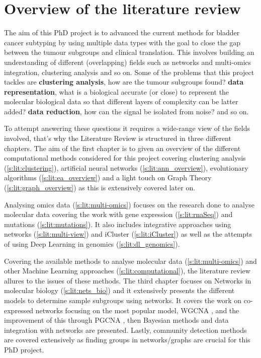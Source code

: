 

\section{Overview of the literature review}


The aim of this PhD project is to advanced the current methods for bladder cancer subtyping by using multiple data types with the goal to close the gap between the tumour subgroups and clinical translation. This involves building an understanding of different (overlapping) fields such as networks and multi-omics integration, clustering analysis and so on. Some of the problems that this project tackles are \textbf{clustering analysis}, how are the tumour subgroups found? \textbf{data representation}, what is a biological accurate (or close) to represent the molecular biological data so that different layers of complexity can be latter added? \textbf{data reduction}, how can the signal be isolated from noise? and so on.

To attempt answering these questions it requires a wide-range view of the fields involved, that's why the Literature Review is structured in three different chapters. The aim of the first chapter is to given an overview of the different computational methods considered for this project covering clustering analysis (\ref{s:lit:clustering}), artificial neural networks (\ref{s:lit:ann_overview}), evolutionary algorithms (\ref{s:lit:ea_overview}) and a light touch on Graph Theory (\ref{s:lit:graph_overview}) as this is extensively covered later on.

Analysing omics data (\ref{s:lit:multi-omics}) focuses on the research done to analyse molecular data covering the work with gene expression (\ref{s:lit:rnaSeq}) and mutations (\ref{s:lit:mutations}). It also includes integrative approaches using networks (\ref{s:lit:multi-view}) and iCluster (\ref{s:lit:iCluster}) as well as the attempts of using Deep Learning in genomics (\ref{s:lit:dl_genomics}). 

Covering the available methods to analyse molecular data (\ref{s:lit:multi-omics}) and other Machine Learning approaches (\ref{s:lit:computational}), the literature review allures to the issues of these methods. The third chapter focuses on Networks in molecular biology (\ref{s:lit:nets_bio}) and it extensively presents the different models to determine sample subgroups using networks. It covers the work on co-expressed networks focusing on the most popular model, WGCNA \cite{Langfelder2008-sn}, and the improvement of this through PGCNA \cite{Care2019-ij}, then Bayesian methods and data integration with networks are presented. Lastly, community detection methods are covered extensively as finding groups in networks/graphs are crucial for this PhD project.


